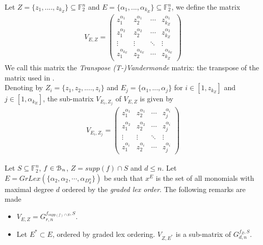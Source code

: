 \documentclass[11pt]{llncs}
\begin{document}
\begin{definition}\label{def:tVandermonde}
    Let $Z = \{z_1, ...., z_{k_Z}\} \subseteq \mathbb{F}_2^n$ and $E = \{\alpha_1, ..., \alpha_{k_E}\}\subseteq \mathbb{F}_2^n$, we define the matrix
    \begin{align*}
        V_{E,Z} = 
        \begin{pmatrix}
            z_1^{\alpha_1} & z_2^{\alpha_1} & \cdots & z_{k_Z}^{\alpha_1} \\
            z_1^{\alpha_2} & z_2^{\alpha_2} & \cdots & z_{k_Z}^{\alpha_2} \\
            \vdots & \vdots & \ddots & \vdots \\
            z_1^{\alpha_{k_E}} & z_2^{\alpha_{k_E}} & \cdots & z_{k_Z}^{\alpha_{k_E}}
        \end{pmatrix}
    \end{align*}
    We call this matrix the \textit{Transpose (T-)Vandermonde} matrix: the transpose of the matrix used in \cite{armknecht2006efficient}.\\
    Denoting by $Z_i = \{z_1, z_2, ...., z_i\}$ and $E_j = \{\alpha_1, ..., \alpha_j\}$ for $i\in[1,z_{k_Z}]$ and $j\in[1,\alpha_{k_E}]$, the sub-matrix $V_{E_i, Z_j}$ of $V_{E,Z}$ is given by
    \begin{align*}
        V_{E_i,Z_j} = 
        \begin{pmatrix}
            z_1^{\alpha_1} & z_2^{\alpha_1} & \cdots & z_j^{\alpha_{i}} \\
            z_1^{\alpha_2} & z_2^{\alpha_2} & \cdots & z_j^{\alpha_{i}} \\
            \vdots & \vdots & \ddots & \vdots \\
            z_{1}^{\alpha_i} & z_{2}^{\alpha_i} & \cdots & z_{j}^{\alpha_i}
        \end{pmatrix}
    \end{align*}
\end{definition}

\begin{remark}\label{rem:subsetOfReedMuller}
    Let $S\subseteq \mathbb{F}_2^n$, $f \in \mathcal{B}_{n}$, $Z = supp(f) \cap S$ and $d \leq n$. Let $E = GrLex(\{\alpha_2, \alpha_2, \cdots, \alpha_{D_d^n}\})$ be such that $x^E$ is the set of all monomials with maximal degree $d$ ordered by the \textit{graded lex order}. The following remarks are made
    \begin{itemize}
        \item $V_{E,Z} = G_{r,n}^{f_{supp\left(f\right) \cap S},S}$.
        \item Let $E^{*}\subset E$, ordered by graded lex ordering. $V_{Z,E^{*}}$ is a sub-matrix of $G_{d,n}^{f_Z, S}$.
    \end{itemize}
\end{remark}
\end{document}
